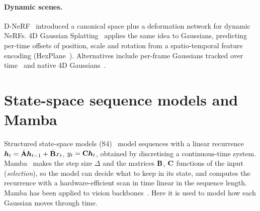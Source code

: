 \paragraph{Dynamic scenes.} D-NeRF~\citep{pumarola2021dnerf} introduced a canonical space plus a deformation network
for dynamic NeRFs. 4D Gaussian Splatting~\citep{wu20244dgs} applies the same idea to Gaussians, predicting per-time
offsets of position, scale and rotation from a spatio-temporal feature encoding (HexPlane~\citep{cao2023hexplane}).
Alternatives include per-frame Gaussians tracked over time~\citep{luiten2024dynamic} and native 4D
Gaussians~\citep{yang2024realtime4dgs}.

\section{State-space sequence models and Mamba}
Structured state-space models (S4)~\citep{gu2022s4} model sequences with a linear recurrence
$\bm{h}_t = \bar{\mathbf{A}}\bm{h}_{t-1} + \bar{\mathbf{B}}x_t$, $y_t = \mathbf{C}\bm{h}_t$, obtained by discretising a
continuous-time system. Mamba~\citep{gu2023mamba} makes the step size $\Delta$ and the matrices $\mathbf{B}$, $\mathbf{C}$
functions of the input (\emph{selection}), so the model can decide what to keep in its state, and computes the
recurrence with a hardware-efficient scan in time linear in the sequence length. Mamba has been applied to vision
backbones~\citep{zhu2024visionmamba}. Here it is used to model how each Gaussian moves through time.
